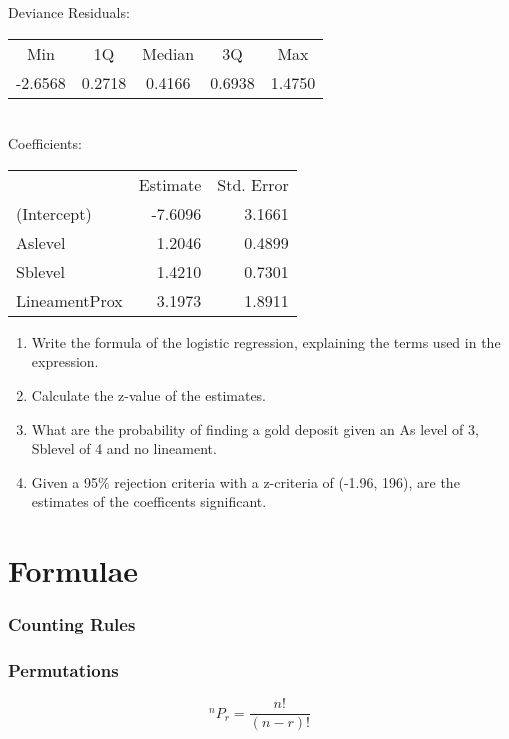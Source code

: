 \documentclass[a4paper,12pt]{article}
\theoremstyle{Qstyle}
\newcommand*{\Pick}[2]{{}^{#1}P_{#2}}%
\begin{document}
\begin{enumerate}
{{					Deviance Residuals: \\
					\begin{tabular}{ccccc}
						Min    &     1Q &    Median &        3Q  &      Max \\  
						-2.6568  &  0.2718 &   0.4166 &   0.6938  &  1.4750  \\  
					\end{tabular}\\
					Coefficients:\\
					\begin{tabular}{lrr}
						& Estimate & Std. Error  \\
						(Intercept) &-7.6096  &   3.1661   \\
						Aslevel        & 1.2046  &   0.4899    \\
						Sblevel        & 1.4210    & 0.7301   \\    
						LineamentProx  & 3.1973    & 1.8911   
					\end{tabular}
				}
			}
			\begin{enumerate}
				\item Write the formula of the logistic regression, explaining the terms used in the expression.
				\item Calculate the z-value of the estimates.
				\item What are the probability of finding a gold deposit given an As level of 3, Sblevel of 4 and no lineament.
				\item Given a 95\% rejection criteria with a z-criteria of (-1.96, 196), are the estimates of the coefficents significant. 
				
			\end{enumerate}
			
		
		
		
	\end{enumerate}
	
	
	\newpage
	
	\section*{Formulae}
	
	\subsubsection*{Counting Rules}
	\subsubsection*{Permutations }
	\[\Pick{n}{r}=\frac{n!}{(n-r)!}\] 
\end{document}
